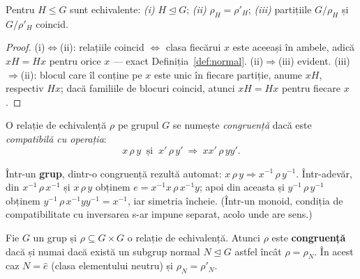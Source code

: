 \begin{teorema}\label{teo:normalrho}
Pentru $H\le G$ sunt echivalente: \emph{(i)} $H\trianglelefteq G$; \emph{(ii)} $\rho_H=\rho'_H$; \emph{(iii)} partițiile $G/\rho_H$ și $G/\rho'_H$ coincid.
\end{teorema}

\begin{proof}
(i)$\iff$(ii): relațiile coincid $\iff$ clasa fiecărui $x$ este aceeași în ambele, adică $xH=Hx$ pentru orice $x$ --- exact Definiția~\ref{def:normal}. (ii)$\Rightarrow$(iii) evident. (iii)$\Rightarrow$(ii): blocul care îl conține pe $x$ este unic în fiecare partiție, anume $xH$, respectiv $Hx$; dacă familiile de blocuri coincid, atunci $xH=Hx$ pentru fiecare $x$.
\end{proof}

\begin{definitie}[congruență]\label{def:congruenta}
O relație de echivalență $\rho$ pe grupul $G$ se numește \emph{congruență} dacă este \emph{compatibilă cu operația}:
\[
x\,\rho\,y\ \text{ și }\ x'\,\rho\,y'\ \Longrightarrow\ xx'\,\rho\,yy' .
\]
\end{definitie}

\begin{observatie}\label{obs:invcompat}
Într-un \textbf{grup}, dintr-o congruență rezultă automat: $x\,\rho\,y\Rightarrow x^{-1}\,\rho\,y^{-1}$. Într-adevăr, din $x^{-1}\,\rho\,x^{-1}$ și $x\,\rho\,y$ obținem $e=x^{-1}x\,\rho\,x^{-1}y$; apoi din aceasta și $y^{-1}\,\rho\,y^{-1}$ obținem $y^{-1}\,\rho\,x^{-1}yy^{-1}=x^{-1}$, iar simetria încheie. (Într-un monoid, condiția de compatibilitate cu inversarea s-ar impune separat, acolo unde are sens.)
\end{observatie}

\begin{teorema}\label{teo:congruenta}
Fie $G$ un grup și $\rho\subseteq G\times G$ o relație de echivalență. Atunci $\rho$ este \textbf{congruență} dacă și numai dacă există un subgrup normal $N\trianglelefteq G$ astfel încât $\rho=\rho_N$. În acest caz $N=\widehat e$ (clasa elementului neutru) și $\rho_N=\rho'_N$.
\end{teorema}

